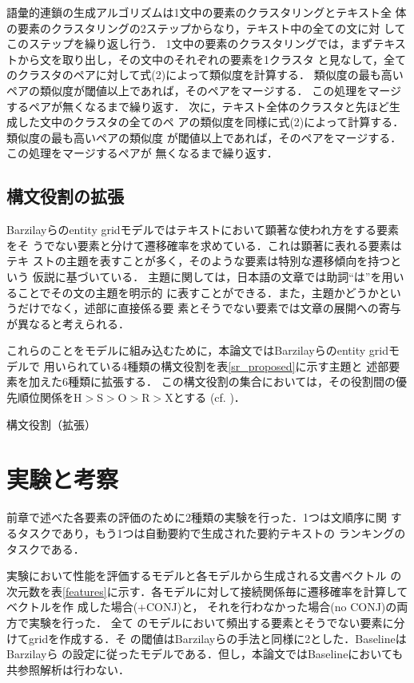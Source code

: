 \documentclass[japanese]{jnlp_1.4}
\begin{document}
   語彙的連鎖の生成アルゴリズムは1文中の要素のクラスタリングとテキスト全
   体の要素のクラスタリングの2ステップからなり，テキスト中の全ての文に対
   してこのステップを繰り返し行う．
   1文中の要素のクラスタリングでは，まずテキストから文を取り出し，その文中のそれぞれの要素を1クラスタ
   と見なして，全てのクラスタのペアに対して式(2)によって類似度を計算する．
   類似度の最も高いペアの類似度が閾値以上であれば，そのペアをマージする．
   この処理をマージするペアが無くなるまで繰り返す．
   次に，テキスト全体のクラスタと先ほど生成した文中のクラスタの全てのペ
   アの類似度を同様に式(2)によって計算する．類似度の最も高いペアの類似度
   が閾値以上であれば，そのペアをマージする．この処理をマージするペアが
   無くなるまで繰り返す．

  \subsection{構文役割の拡張}

  Barzilayら\cite{barzilay2008}のentity gridモデルではテキストにおいて顕著な使われ方をする要素をそ
  うでない要素と分けて遷移確率を求めている．これは顕著に表れる要素はテキ
  ストの主題を表すことが多く，そのような要素は特別な遷移傾向を持つという
  仮説に基づいている．
  主題に関しては，日本語の文章では助詞``は''を用いることでその文の主題を明示的
  に表すことができる．また，主題かどうかというだけでなく，述部に直接係る要
  素とそうでない要素では文章の展開への寄与が異なると考えられる．

  これらのことをモデルに組み込むために，本論文ではBarzilayらのentity gridモデルで
  用いられている4種類の構文役割を表\ref{sr_proposed}に示す主題と
  述部要素を加えた6種類に拡張する．
  この構文役割の集合においては，その役割間の優先順位関係をH$>$S$>$O$>$R$>$Xとする
   (cf. \cite{marilyn1994})．


  \begin{table}[t]
   \caption{構文役割（拡張）}\label{sr_proposed}

  \end{table}


 \section{実験と考察}

 前章で述べた各要素の評価のために2種類の実験を行った．1つは文順序に関
 するタスクであり，もう1つは自動要約で生成された要約テキストの
 ランキングのタスクである．

 実験において性能を評価するモデルと各モデルから生成される文書ベクトル
 の次元数を表\ref{features}に示す．各モデルに対して接続関係毎に遷移確率を計算してベクトルを作
 成した場合(+CONJ)と，
 それを行わなかった場合(no CONJ)の両方で実験を行った．
 全て
 のモデルにおいて頻出する要素とそうでない要素に分けてgridを作成する．そ
 の閾値はBarzilayらの手法と同様に2とした．BaselineはBarzilayら
 \cite{barzilay2008}の設定に従ったモデルである．但し，本論文ではBaselineにおいても共参照解析は行わない．
\end{document}
